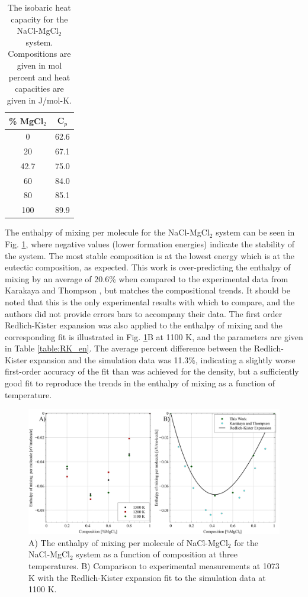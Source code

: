 \documentclass[review]{elsarticle}
\providecommand{\DIFdelbeginFL}{} %
\providecommand{\DIFdelendFL}{} %
\newcommand{\DIFscaledelfig}{0.5}
\newlength{\DIFdelgraphicswidth} %
\newlength{\DIFdelgraphicsheight} %
\newcommand{\DIFdelincludegraphics}[2][]{%
\sbox{\DIFdelgraphicsbox}{\DIFOincludegraphics[#1]{#2}}%
\settoboxwidth{\DIFdelgraphicswidth}{\DIFdelgraphicsbox} %
\settoboxtotalheight{\DIFdelgraphicsheight}{\DIFdelgraphicsbox} %
\scalebox{\DIFscaledelfig}{%
\parbox[b]{\DIFdelgraphicswidth}{\usebox{\DIFdelgraphicsbox}\\[-\baselineskip] \rule{\DIFdelgraphicswidth}{0em}}\llap{\resizebox{\DIFdelgraphicswidth}{\DIFdelgraphicsheight}{%
\setlength{\unitlength}{\DIFdelgraphicswidth}%
\begin{picture}(1,1)%
\thicklines\linethickness{2pt} %
{\color[rgb]{1,0,0}\put(0,0){\framebox(1,1){}}}%
{\color[rgb]{1,0,0}\put(0,0){\line( 1,1){1}}}%
{\color[rgb]{1,0,0}\put(0,1){\line(1,-1){1}}}%
\end{picture}%
}\hspace*{3pt}}} %
} %
\DeclareRobustCommand{\DIFdelbeginFL}{\DIFOdelbeginFL \let\includegraphics\DIFdelincludegraphics} %
\DeclareRobustCommand{\DIFdelendFL}{\DIFOaddendFL \let\includegraphics\DIFOincludegraphics} %
\begin{document}
\begin{table}[h!]
\centering
\caption{The isobaric heat capacity for the NaCl-MgCl$_2$ system. Compositions are given in mol percent and heat capacities are given in J/mol-K.}
\DIFdelbeginFL %

\DIFdelendFL \begin{tabular}{|c|c|}
\hline
\% MgCl$_2$ &  C$_p$\\
\hline
0  &  62.6\\
20 &  67.1  \\
42.7  &  75.0  \\
60 &  84.0  \\
80 &  85.1  \\
100 &  89.9  \\
\hline
\end{tabular}
\label{table:cp}
\end{table}

The enthalpy of mixing per molecule for the NaCl-MgCl$_2$ system can be seen in Fig. \ref{fig:enthalpy}, where negative values (lower formation energies) indicate the stability of the system. The most stable composition is at the lowest energy which is at the eutectic composition, as expected. This work is over-predicting the enthalpy of mixing by an average of 20.6\% when compared to the experimental data from Karakaya and Thompson \cite{karakaya1986thermodynamic}, but matches the compositional trends. It should be noted that this is the only experimental results with which to compare, and the authors did not provide errors bars to accompany their data. The first order Redlich-Kister expansion was also applied to the enthalpy of mixing and the corresponding fit is illustrated in Fig. \ref{fig:enthalpy}B at 1100 K, and the parameters are given in Table \ref{table:RK_en}. The average percent difference between the Redlich-Kister expansion and the simulation data was 11.3\%, indicating a slightly worse first-order accuracy of the fit than was achieved for the density, but a sufficiently good fit to reproduce the trends in the enthalpy of mixing as a function of temperature.

\begin{figure}[h]
 \centering
 \includegraphics[width=1.0\textwidth]{images/enthalpy.jpg} 
 \caption{A) The enthalpy of mixing per molecule of NaCl-MgCl$_{2}$ for the NaCl-MgCl$_{2}$ system as a function of composition at three temperatures. B) Comparison to experimental measurements at 1073 K \cite{karakaya1986thermodynamic} with the Redlich-Kister expansion fit to the simulation data at 1100 K.}
 \label{fig:enthalpy}
\end{figure} 
\end{document}
